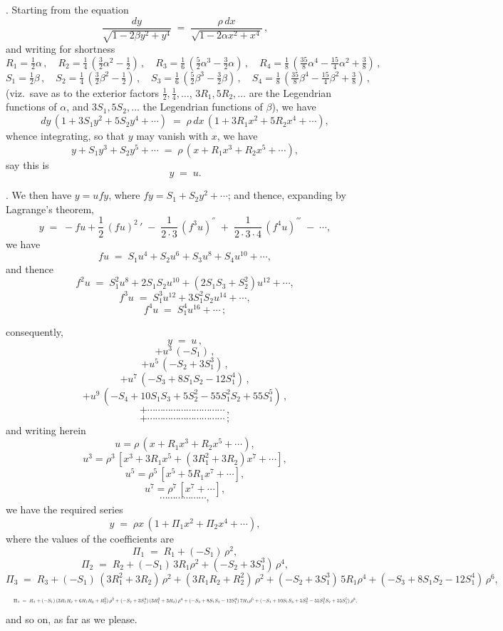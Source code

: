 \documentclass[11pt]{article}
\begin{document}
. Starting from the equation
\[
\frac{dy}{\sqrt{1 - 2\beta y^2 + y^4}} \;=\; \frac{\rho\,dx}{\sqrt{1 - 2\alpha x^2 + x^4}}\,,
\]
and writing for shortness
\[
R_1 = \tfrac{1}{2}\alpha\,,\quad R_2 = \tfrac{1}{4}\,(\tfrac{3}{2}\alpha^2 - \tfrac{1}{2})\,,\quad R_3 = \tfrac{1}{6}\,(\tfrac{5}{2}\alpha^3 - \tfrac{3}{2}\alpha)\,,\quad R_4 = \tfrac{1}{8}\,(\tfrac{35}{8}\alpha^4 - \tfrac{15}{4}\alpha^2 + \tfrac{3}{8})\,,
\]
\[
S_1 = \tfrac{1}{2}\beta\,,\quad S_2 = \tfrac{1}{4}\,(\tfrac{3}{2}\beta^2 - \tfrac{1}{2})\,,\quad S_3 = \tfrac{1}{6}\,(\tfrac{5}{2}\beta^3 - \tfrac{3}{2}\beta)\,,\quad S_4 = \tfrac{1}{8}\,(\tfrac{35}{8}\beta^4 - \tfrac{15}{4}\beta^2 + \tfrac{3}{8})\,,
\]
(viz.\ save as to the exterior factors $\tfrac{1}{2}, \tfrac{1}{4}, \ldots$, $3R_1, 5R_2, \ldots$ are the Legendrian functions of $\alpha$, and $3S_1, 5S_2, \ldots$ the Legendrian functions of $\beta$), we have
\[
dy\,(1 + 3 S_1 y^2 + 5 S_2 y^4 + \cdots) \;=\; \rho\,dx\,(1 + 3R_1 x^2 + 5 R_2 x^4 + \cdots),
\]
whence integrating, so that $y$ may vanish with $x$, we have
\[
y + S_1 y^3 + S_2 y^5 + \cdots \;=\; \rho\,(x + R_1 x^3 + R_2 x^5 + \cdots),
\]
say this is
\[
y \;=\; u.
\]

\medskip

. We then have $y = u f y$, where $f y = S_1 + S_2 y^2 + \cdots$; and thence, expanding by Lagrange's theorem,
\[
y \;=\; -fu + \frac{1}{2}\,(fu)^2\!\,'\;-\;\frac{1}{2\cdot 3}\,(f^3 u)^{''}\;+\;\frac{1}{2\cdot 3\cdot 4}\,(f^4 u)^{'''}\;-\;\cdots,
\]
we have
\[
fu \;=\; S_1 u^4 + S_2 u^6 + S_3 u^8 + S_4 u^{10} + \cdots,
\]
and thence
\[
f^2 u \;=\; S_1^2 u^8 + 2 S_1 S_2 u^{10} + (2 S_1 S_3 + S_2^2)u^{12} + \cdots,
\]
\[
f^3 u \;=\; S_1^3 u^{12} + 3 S_1^2 S_2 u^{14} + \cdots,
\]
\[
f^4 u \;=\; S_1^4 u^{16} + \cdots\,;
\]

\newpage

\noindent consequently,
\[
y \;=\; u\,,
\]
\[
+ u^3\,(-S_1)\,,
\]
\[
+ u^5\,(-S_2 + 3 S_1^3)\,,
\]
\[
+ u^7\,(-S_3 + 8 S_1 S_2 - 12 S_1^4)\,,
\]
\[
+ u^9\,(-S_4 + 10 S_1 S_3 + 5 S_2^2 - 55 S_1^2 S_2 + 55 S_1^5)\,,
\]
\[
+ \cdots\cdots\cdots\cdots\cdots\cdots\cdots\cdots\cdots\cdots\,,
\]
\[
+ \cdots\cdots\cdots\cdots\cdots\cdots\cdots\cdots\cdots\cdots\,;
\]
and writing herein
\[
u = \rho\,(x + R_1 x^3 + R_2 x^5 + \cdots),
\]
\[
u^3 = \rho^3\,[x^3 + 3 R_1 x^5 + (3 R_1^2 + 3 R_2) x^7 + \cdots],
\]
\[
u^5 = \rho^5\,[x^5 + 5 R_1 x^7 + \cdots],
\]
\[
u^7 = \rho^7\,[x^7 + \cdots],
\]
\[
\cdots\cdots\cdots\cdots\cdots\cdots,
\]
we have the required series
\[
y \;=\; \rho x\,(1 + \Pi_1 x^2 + \Pi_2 x^4 + \cdots),
\]
where the values of the coefficients are
\[
\Pi_1 \;=\; R_1 + (-S_1)\,\rho^2,
\]
\[
\Pi_2 \;=\; R_2 + (-S_1)\,3 R_1 \rho^2 + (-S_2 + 3 S_1^3)\,\rho^4,
\]
\[
\Pi_3 \;=\; R_3 + (-S_1)\,(3 R_1^2 + 3 R_2)\,\rho^2 + (3 R_1 R_2 + R_2^2)\,\rho^2 + (-S_2 + 3 S_1^3)\,5 R_1 \rho^4 + (-S_3 + 8 S_1 S_2 - 12 S_1^4)\,\rho^6,
\]
\[
\resizebox{\textwidth}{!}{$\displaystyle
\Pi_4 \;=\; R_4 + (-S_1)\,(3 R_1 R_2 + 6 R_1 R_3 + R_2^2)\,\rho^2 + (-S_2 + 3 S_1^3)\,(3 R_1^2 + 3 R_2)\,\rho^4 + (-S_3 + 8 S_1 S_2 - 12 S_1^4)\,7 R_1 \rho^6 + (-S_4 + 10 S_1 S_3 + 5 S_2^2 - 55 S_1^2 S_2 + 55 S_1^5)\,\rho^8,
$}
\]
and so on, as far as we please.
\end{document}
